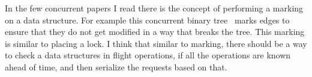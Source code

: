 In the few concurrent papers I read there is the concept of performing a marking
on a data structure. For example this concurrent binary
tree~\cite{fast-concurrent-bin} marks edges to ensure that they do not get
modified in a way that breaks the tree. This marking is similar to placing a
lock. I think that similar to marking, there should be a way to check a data
structures in flight operations, if all the operations are known ahead of time,
and then serialize the requests based on that.




